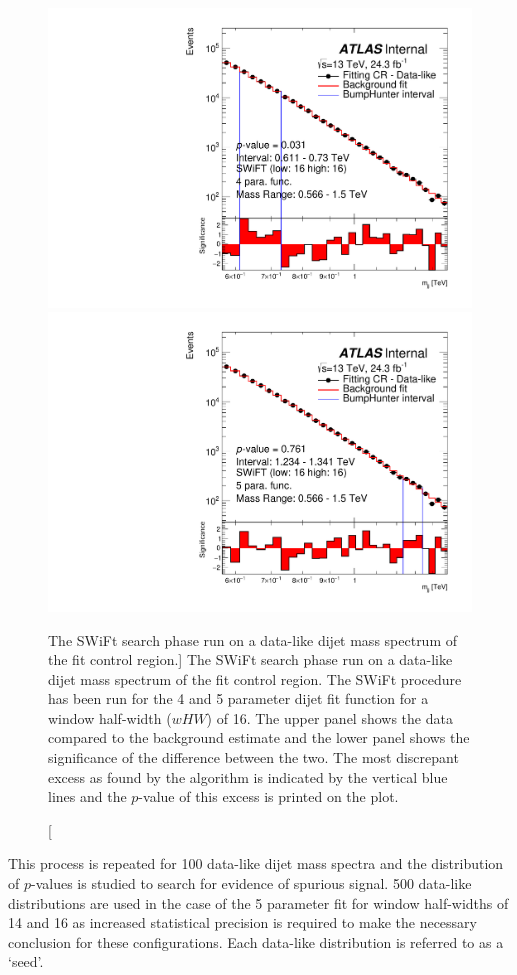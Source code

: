 \begin{figure}[!htb]
\captionsetup[subfigure]{aboveskip=0pt,justification=centering}
\centering
{} {
  \includegraphics[width=0.45\linewidth, angle=0]{figs/Dibjet/LowMass/FitStudy_min566/bhFit_corrFitCR_dataLike_v13_4para_low16_high16.pdf}
}
 {
  \includegraphics[width=0.45\linewidth, angle=0]{figs/Dibjet/LowMass/FitStudy_min566/bhFit_corrFitCR_dataLike_v13_5para_low16_high16.pdf}
}
\caption
    [The SWiFt search phase run on a data-like dijet mass spectrum of the \lm{} fit control region.]
    {\label{fig:bhFit_lm_corrFitCR_dataLike}
      The SWiFt search phase run on a data-like dijet mass spectrum of the \lm{} fit control region.
      The SWiFt procedure has been run for the 4 and 5 parameter dijet fit function for a window half-width ($wHW$) of 16.
      The upper panel shows the data compared to the background estimate and the lower panel shows the significance of the difference between the two.
      The most discrepant excess as found by the \bh{} algorithm is indicated by the vertical blue lines and the \mbox{$p$-value} of this excess is printed on the plot. 
}
\end{figure}

This process is repeated for 100 data-like dijet mass spectra and the distribution of \bh{} \mbox{$p$-value}s is studied to search for evidence of spurious signal.
500 data-like distributions are used in the case of the 5 parameter fit for window half-widths of 14 and 16
as increased statistical precision is required to make the necessary conclusion for these configurations.
Each data-like distribution is referred to as a `seed'.%

